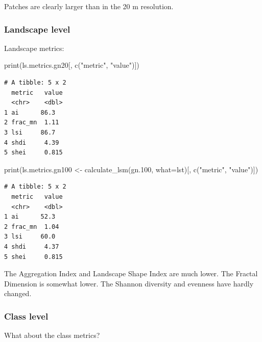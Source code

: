 \documentclass[
  letterpaper,
  DIV=11,
  numbers=noendperiod]{scrartcl}
\newenvironment{Shaded}{\begin{snugshade}}{\end{snugshade}}
\newcommand{\AttributeTok}[1]{\textcolor[rgb]{0.40,0.45,0.13}{#1}}
\newcommand{\ConstantTok}[1]{\textcolor[rgb]{0.56,0.35,0.01}{#1}}
\newcommand{\DecValTok}[1]{\textcolor[rgb]{0.68,0.00,0.00}{#1}}
\newcommand{\FloatTok}[1]{\textcolor[rgb]{0.68,0.00,0.00}{#1}}
\newcommand{\FunctionTok}[1]{\textcolor[rgb]{0.28,0.35,0.67}{#1}}
\newcommand{\NormalTok}[1]{\textcolor[rgb]{0.00,0.23,0.31}{#1}}
\newcommand{\OtherTok}[1]{\textcolor[rgb]{0.00,0.23,0.31}{#1}}
\newcommand{\SpecialCharTok}[1]{\textcolor[rgb]{0.37,0.37,0.37}{#1}}
\newcommand{\StringTok}[1]{\textcolor[rgb]{0.13,0.47,0.30}{#1}}
\begin{document}
Patches are clearly larger than in the 20 m resolution.

\hypertarget{landscape-level-1}{%
\subsubsection{Landscape level}\label{landscape-level-1}}

Landscape metrics:

\begin{Shaded}
\begin{Highlighting}[]
\FunctionTok{print}\NormalTok{(ls.metrics.gn20[, }\FunctionTok{c}\NormalTok{(}\StringTok{"metric"}\NormalTok{, }\StringTok{"value"}\NormalTok{)])}
\end{Highlighting}
\end{Shaded}

\begin{verbatim}
# A tibble: 5 x 2
  metric   value
  <chr>    <dbl>
1 ai      86.3  
2 frac_mn  1.11 
3 lsi     86.7  
4 shdi     4.39 
5 shei     0.815
\end{verbatim}

\begin{Shaded}
\begin{Highlighting}[]
\FunctionTok{print}\NormalTok{(ls.metrics.gn100 }\OtherTok{\textless{}{-}} \FunctionTok{calculate\_lsm}\NormalTok{(gn}\FloatTok{.100}\NormalTok{, }\AttributeTok{what=}\NormalTok{lst)[, }\FunctionTok{c}\NormalTok{(}\StringTok{"metric"}\NormalTok{, }\StringTok{"value"}\NormalTok{)])}
\end{Highlighting}
\end{Shaded}

\begin{verbatim}
# A tibble: 5 x 2
  metric   value
  <chr>    <dbl>
1 ai      52.3  
2 frac_mn  1.04 
3 lsi     60.0  
4 shdi     4.37 
5 shei     0.815
\end{verbatim}

The Aggregation Index and Landscape Shape Index are much lower. The
Fractal Dimension is somewhat lower. The Shannon diversity and evenness
have hardly changed.

\hypertarget{class-level-1}{%
\subsubsection{Class level}\label{class-level-1}}

What about the class metrics?

\begin{Shaded}
\end{Shaded}
\end{document}
